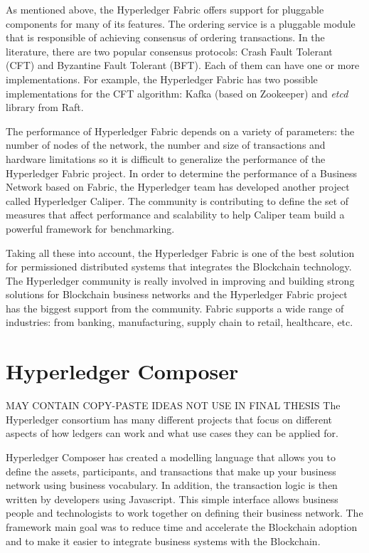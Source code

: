 As mentioned above, the Hyperledger Fabric offers support for pluggable components for many of its features. The ordering service is a pluggable module that is responsible of achieving consensus of ordering transactions. In the literature, there are two popular consensus protocols: Crash Fault Tolerant (CFT) and Byzantine Fault Tolerant (BFT). Each of them can have one or more implementations.
For example, the Hyperledger Fabric has two possible implementations for the CFT algorithm: Kafka (based on Zookeeper) and \emph{etcd} library from Raft.

The performance of Hyperledger Fabric depends on a variety of parameters: the number of nodes of the network, the number and size of transactions and hardware limitations so it is difficult to generalize the performance of the Hyperledger Fabric project. 
In order to determine the performance of a Business Network based on Fabric, the Hyperledger team has developed another project called Hyperledger Caliper. The community is contributing to define the set of measures that affect performance and scalability to help Caliper team build a powerful framework for benchmarking. 

Taking all these into account, the Hyperledger Fabric is one of the best solution for permissioned distributed systems that integrates the Blockchain technology.
The Hyperledger community is really involved in improving and building strong solutions for Blockchain business networks and the Hyperledger Fabric project has the biggest support from the community. Fabric supports a wide range of industries: from banking, manufacturing, supply chain to retail, healthcare, etc.
\fi

\section{Hyperledger Composer}
\label{sub-sec:chapter1-section3}




\iffalse
MAY CONTAIN COPY-PASTE IDEAS
NOT USE IN FINAL THESIS
The Hyperledger consortium has many different projects that focus on different aspects of how ledgers can work and what use cases they can be applied for.

Hyperledger Composer has created a modelling language that allows you to define the assets, participants, and transactions that make up your business network using business vocabulary. In addition, the transaction logic is then written by developers using Javascript. This simple interface allows business people and technologists to work together on defining their business network.
The framework main goal was to reduce time and accelerate the Blockchain adoption and to make it easier to integrate business systems with the Blockchain.

